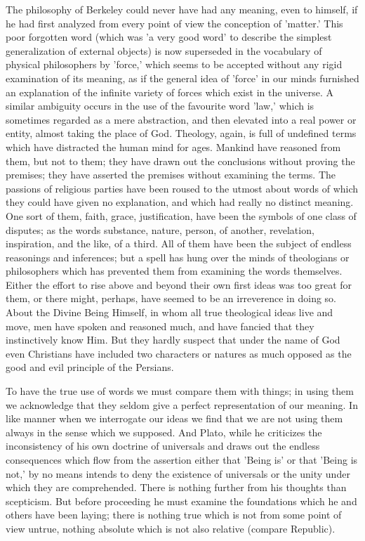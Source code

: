 \documentclass[11pt,letter]{article}
\begin{document}
\par  The philosophy of Berkeley could never have had any meaning, even to himself, if he had first analyzed from every point of view the conception of 'matter.' This poor forgotten word (which was 'a very good word' to describe the simplest generalization of external objects) is now superseded in the vocabulary of physical philosophers by 'force,' which seems to be accepted without any rigid examination of its meaning, as if the general idea of 'force' in our minds furnished an explanation of the infinite variety of forces which exist in the universe. A similar ambiguity occurs in the use of the favourite word 'law,' which is sometimes regarded as a mere abstraction, and then elevated into a real power or entity, almost taking the place of God. Theology, again, is full of undefined terms which have distracted the human mind for ages. Mankind have reasoned from them, but not to them; they have drawn out the conclusions without proving the premises; they have asserted the premises without examining the terms. The passions of religious parties have been roused to the utmost about words of which they could have given no explanation, and which had really no distinct meaning. One sort of them, faith, grace, justification, have been the symbols of one class of disputes; as the words substance, nature, person, of another, revelation, inspiration, and the like, of a third. All of them have been the subject of endless reasonings and inferences; but a spell has hung over the minds of theologians or philosophers which has prevented them from examining the words themselves. Either the effort to rise above and beyond their own first ideas was too great for them, or there might, perhaps, have seemed to be an irreverence in doing so. About the Divine Being Himself, in whom all true theological ideas live and move, men have spoken and reasoned much, and have fancied that they instinctively know Him. But they hardly suspect that under the name of God even Christians have included two characters or natures as much opposed as the good and evil principle of the Persians.

\par  To have the true use of words we must compare them with things; in using them we acknowledge that they seldom give a perfect representation of our meaning. In like manner when we interrogate our ideas we find that we are not using them always in the sense which we supposed. And Plato, while he criticizes the inconsistency of his own doctrine of universals and draws out the endless consequences which flow from the assertion either that 'Being is' or that 'Being is not,' by no means intends to deny the existence of universals or the unity under which they are comprehended. There is nothing further from his thoughts than scepticism. But before proceeding he must examine the foundations which he and others have been laying; there is nothing true which is not from some point of view untrue, nothing absolute which is not also relative (compare Republic).
\end{document}
